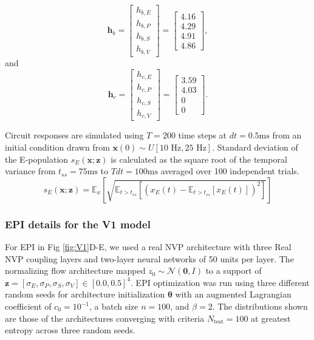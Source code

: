 \documentclass[11pt]{article}
\begin{document}
\begin{equation}
\mathbf{h}_b =  \begin{bmatrix} h_{b,E} \\ h_{b,P} \\ h_{b,S} \\ h_{b,V} \end{bmatrix} =
 \begin{bmatrix} 4.16 \\ 4.29 \\ 4.91 \\ 4.86 \end{bmatrix} ,
\end{equation} 
and
\begin{equation} 
\mathbf{h}_c = \begin{bmatrix} h_{c,E} \\ h_{c,P} \\ h_{c,S} \\ h_{c,V} \end{bmatrix} = 
\begin{bmatrix} 3.59 \\ 4.03 \\ 0 \\ 0 \end{bmatrix}.
\end{equation} 

Circuit responses are simulated using $T = 200$ time steps at $dt = 0.5\text{ms}$ from an initial condition drawn from $\mathbf{x}(0) \sim U\left[10\text{ Hz}, 25\text{ Hz}\right]$.
Standard deviation of the E-population $s_E(\mathbf{x}; \mathbf{z})$ is calculated as the square root of the temporal variance from $t_{ss} = 75\text{ms}$ to $Tdt = 100\text{ms}$ averaged over 100 independent trials.
\begin{equation}
s_E(\mathbf{x}; \mathbf{z}) =\mathbb{E}_{x}\left[\sqrt{\mathbb{E}_{t > t_{ss}}\left[\left(x_E(t) -\mathbb{E}_{t > t_{ss}}\left[ x_E(t) \right]\right)^2 \right]}\right]
\end{equation}

\subsubsection{EPI details for the V1 model}
For EPI in Fig \ref{fig:V1}D-E, we used a real NVP architecture with three Real NVP coupling layers and two-layer neural networks of 50 units per layer.
The normalizing flow architecture mapped $z_0 \sim \mathcal{N}(\mathbf{0}, I)$ to a support of $\mathbf{z} = [\sigma_E, \sigma_P, \sigma_S, \sigma_V] \in [0.0, 0.5]^4$.
EPI optimization was run using three different random seeds for architecture initialization $\bm{\theta}$ with an augmented Lagrangian coefficient of $c_0 = 10^{-1}$, a batch size $n=100$, and $\beta = 2$.
The distributions shown are those of the architectures converging with criteria $N_{\text{test}} = 100$ at greatest entropy across three random seeds.
\end{document}
